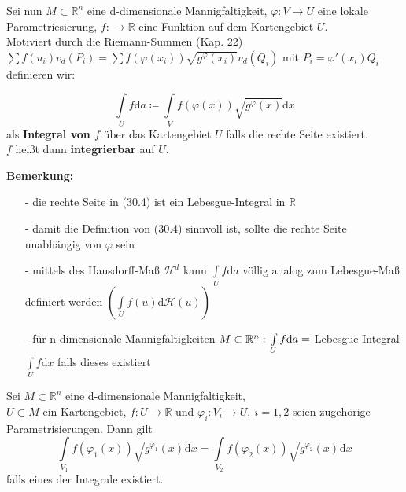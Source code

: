 Sei nun $M \subset \mathbb{R}^n $ eine d-dimensionale Mannigfaltigkeit,
$\varphi: V \rightarrow U $ eine lokale Parametriesierung,
$f: \rightarrow \mathbb{R} $ eine Funktion auf dem Kartengebiet $U$.\\
Motiviert durch die Riemann-Summen (Kap. 22)\\
$\sum f(u_i) v_d(P_i) = \sum f(\varphi(x_i)) \sqrt{g^\varphi (x_i)} v_d(Q_i) $
mit $P_i = \varphi'(x_i) Q_i $
definieren wir:

\begin{definition}
    \begin{equation}
        \int\limits_U f \mathrm{d}a 
        \coloneqq \int\limits_V f(\varphi(x)) \sqrt{g^\varphi (x)} \mathrm{d}x
    \end{equation}
    als \textbf{Integral von $f$} über das Kartengebiet $U$ falls die rechte
    Seite existiert.\\
    $f$ heißt dann \textbf{integrierbar} auf $U$.
\end{definition}

\textbf{Bemerkung:}
\begin{enumerate}
    \item[-]
        die rechte Seite in (30.4) ist ein Lebesgue-Integral in $\mathbb{R}$
    \item[-]
        damit die Definition von (30.4) sinnvoll ist, sollte die rechte Seite
        unabhängig von $\varphi$ sein
    \item[-]
        mittels des Hausdorff-Maß $\mathcal{H}^d $ kann
        $\int\limits_U f \mathrm{d}a $
        völlig analog zum Lebesgue-Maß definiert werden
        $\left(\int\limits_U f(u) \mathrm{d} \mathcal{H} (u) \right) $
    \item[-]
        für n-dimensionale Mannigfaltigkeiten $M \subset \mathbb{R}^n: \\
        \int\limits_U f \mathrm{d}a = $ Lebesgue-Integral 
        $\int\limits_U f \mathrm{d}x $ falls dieses existiert
\end{enumerate}
\newpage
\begin{satz}
    Sei $M \subset \mathbb{R}^n $ eine d-dimensionale Mannigfaltigkeit,\\
    $U \subset M $ ein Kartengebiet, $f:U \rightarrow \mathbb{R} $ und
    $\varphi_i: V_i \rightarrow U,\ i=1,2 $ seien zugehörige Parametrisierungen. Dann gilt
    \begin{equation*}
    	\int\limits_{V_1} f(\varphi_1(x)) \sqrt{g^{\varphi_1} (x)} \mathrm{d}x
    	= \int\limits_{V_2} f(\varphi_2(x)) \sqrt{g^{\varphi_2} (x)} \mathrm{d}x
    \end{equation*}
   	falls eines der Integrale existiert.
\end{satz}

